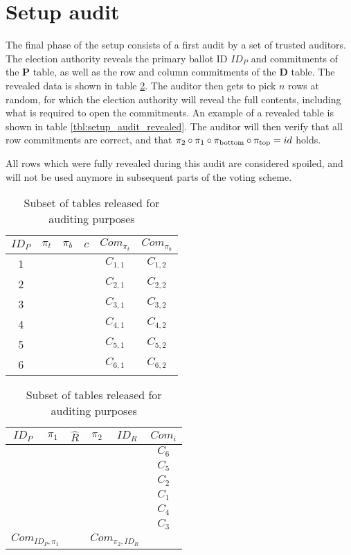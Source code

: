\begin{table}
\end{table}

\section{Setup audit}

The final phase of the setup consists of a first audit by a set of trusted
auditors. The election authority reveals the primary ballot ID $ID_P$ and
commitments of the \textbf{P} table, as well as the row and column commitments
of the \textbf{D} table. The revealed data is shown in table
\ref{tbl:setup_audit}. The auditor then gets to pick $n$ rows at random, for
which the election authority will reveal the full contents, including what is
required to open the commitments. An example of a revealed table is shown in
table \ref{tbl:setup_audit_revealed}. The auditor will then verify that all row
commitments are correct, and that $\pi_2 \circ \pi_1 \circ \pi_{\text{bottom}} \circ \pi_{\text{top}}
= id$ holds.

All rows which were fully revealed during this audit are considered spoiled,
and will not be used anymore in subsequent parts of the voting scheme.

\begin{table}[h]
	\centering
	\begin{subtable}{.5\linewidth}
		\begin{tabular}{|c|c|c|c|c|c|}
			\hline
			$ID_P$ & $\pi_{t}$ & $\pi_{b}$ & $c$ & $Com_{\pi_{t}}$ & $Com_{\pi_{b}}$ \\
			\hline
			1 & & & & $C_{1, 1}$ & $C_{1, 2}$ \\
			2 & & & & $C_{2, 1}$ & $C_{2, 2}$ \\
			3 & & & & $C_{3, 1}$ & $C_{3, 2}$ \\
			4 & & & & $C_{4, 1}$ & $C_{4, 2}$ \\
			5 & & & & $C_{5, 1}$ & $C_{5, 2}$ \\
			6 & & & & $C_{6, 1}$ & $C_{6, 2}$ \\
			\hline
		\end{tabular}
	\end{subtable}%
	\begin{subtable}{.5\linewidth}
		\begin{tabular}{|c|c|c|c|c|c|}
			\hline
			$ID_P$ & $\pi_1$ & $\hat{R}$ & $\pi_2$ & $ID_R$ & $Com_{i}$ \\
			\hline
			& & & & & $C_6$ \\
			& & & & & $C_5$ \\
			& & & & & $C_2$ \\
			& & & & & $C_1$ \\
			& & & & & $C_4$ \\
			& & & & & $C_3$ \\
			\hline
			\multicolumn{2}{|c|}{$Com_{ID_P, \pi_1}$} &   & \multicolumn{2}{c|}{$Com_{\pi_2, ID_R}$} & \\
			\hline
		\end{tabular}
	\end{subtable}
	\caption{Subset of tables released for auditing purposes}
	\label{tbl:setup_audit}
\end{table}

